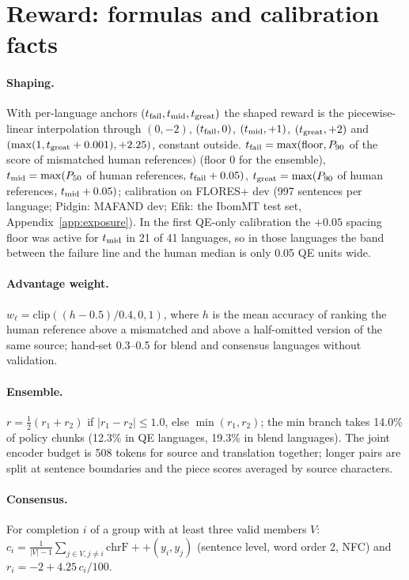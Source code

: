 \section{Reward: formulas and calibration facts}\label{app:reward}
\paragraph{Shaping.} With per-language anchors $(t_{\rm fail},t_{\rm mid},t_{\rm great})$ the shaped reward is the piecewise-linear interpolation through $(0,-2)$, $(t_{\rm fail},0)$, $(t_{\rm mid},+1)$, $(t_{\rm great},+2)$ and $(\max(1,t_{\rm great}+0.001),+2.25)$, constant outside. $t_{\rm fail}=\max(\text{floor},P_{90}$ of the score of mismatched human references$)$ (floor 0 for the ensemble), $t_{\rm mid}=\max(P_{50}$ of human references$,\,t_{\rm fail}+0.05)$, $t_{\rm great}=\max(P_{90}$ of human references$,\,t_{\rm mid}+0.05)$; calibration on FLORES+ dev (997 sentences per language; Pidgin: MAFAND dev; Efik: the IbomMT test set, Appendix~\ref{app:exposure}). In the first QE-only calibration the $+0.05$ spacing floor was active for $t_{\rm mid}$ in 21 of 41 languages, so in those languages the band between the failure line and the human median is only 0.05 QE units wide.
\paragraph{Advantage weight.} $w_\ell=\mathrm{clip}((h-0.5)/0.4,0,1)$, where $h$ is the mean accuracy of ranking the human reference above a mismatched and above a half-omitted version of the same source; hand-set 0.3--0.5 for blend and consensus languages without validation.
\paragraph{Ensemble.} $r=\tfrac12(r_1+r_2)$ if $|r_1-r_2|\le1.0$, else $\min(r_1,r_2)$; the min branch takes 14.0\% of policy chunks (12.3\% in QE languages, 19.3\% in blend languages). The joint encoder budget is 508 tokens for source and translation together; longer pairs are split at sentence boundaries and the piece scores averaged by source characters.
\paragraph{Consensus.} For completion $i$ of a group with at least three valid members $V$: $c_i=\frac1{|V|-1}\sum_{j\in V,j\ne i}\mathrm{chrF{+}{+}}(y_i,y_j)$ (sentence level, word order 2, NFC) and $r_i=-2+4.25\,c_i/100$.

